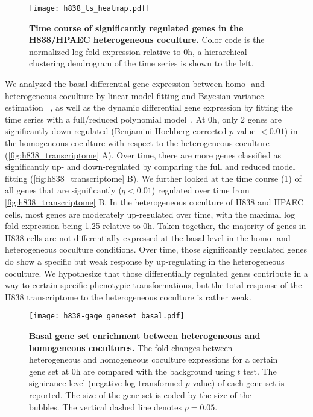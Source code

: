 \begin{figure}[!ht]
\begin{center}
\texttt{[image: h838\_ts\_heatmap.pdf]}
\end{center}
\caption[Gene expression time course in the H838/HPAEC coculture]{
{\bf Time course of significantly regulated genes in the H838/HPAEC heterogeneous coculture.} 
Color code is the normalized log fold expression relative to 0h, a hierarchical
clustering dendrogram of the time series is shown to the left.
}
\label{fig:h838_ts}
\end{figure}

We analyzed the basal differential gene expression between homo- and
heterogeneous coculture by linear model fitting and Bayesian variance estimation~%
\citep{Smyth2004}, as well as the dynamic differential gene expression by fitting
the time series with a full/reduced polynomial model~\citep{Mar2009}. At 0h, only 2
genes are significantly down-regulated (Benjamini-Hochberg
corrected $p$-value $<0.01$) in the homogeneous coculture with respect
to the heterogeneous coculture 
(\ref{fig:h838_transcriptome} A). Over time, there are more
genes classified as significantly up- and down-regulated by comparing the full and
reduced model fitting (\ref{fig:h838_transcriptome} B). 
We further looked at the time course (\ref{fig:h838_ts}) 
of all genes that are
significantly ($q<0.01$) regulated over time from 
\ref{fig:h838_transcriptome} B. In the heterogeneous
coculture of H838 and HPAEC cells, most genes are 
moderately up-regulated over time, with the maximal
log fold expression being 1.25 relative to 0h.
Taken together, the majority of genes
in H838 cells are not differentially expressed at the basal
level in the homo- and heterogeneous
coculture conditions. 
Over time, those significantly regulated genes do show
a specific but weak response by up-regulating in the 
heterogeneous coculture.
We hypothesize that those 
differentially regulated genes contribute in a way 
to certain specific
phenotypic transformations, but the total response of the H838
transcriptome to the heterogeneous coculture is rather weak.

\begin{figure}[!ht]
\begin{center}
\texttt{[image: h838-gage\_geneset\_basal.pdf]}
\end{center}
\caption[Basal gene set enrichment]{
{\bf Basal gene set enrichment between heterogeneous and homogeneous cocultures.} 
The fold changes between heterogeneous and homogeneous coculture expressions 
for a certain gene set at 0h are compared with the background using $t$ test.
The signicance level (negative log-transformed $p$-value) of
each gene set is reported. The size
of the gene set is coded by the size of the bubbles.
The vertical dashed line denotes $p=0.05$.
}
\label{fig:h838_basal_gage_msigdb}
\end{figure}

